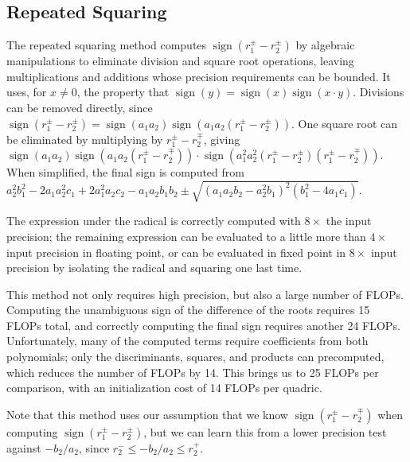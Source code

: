 \documentclass{cccg16}
\DeclareMathOperator{\sign}{sign}
\begin{document}
\subsection{Repeated Squaring}
The repeated squaring method computes $\sign(r_1^\pm-r_2^\pm)$ by algebraic
manipulations to eliminate division and square root
operations, leaving multiplications and additions whose precision requirements can be bounded. 
It uses, for $x\ne 0$,  the property that $\sign(y)=\sign(x)\sign(x\cdot y)$.   
Divisions can be removed directly, since 
 $\sign(r_1^\pm-r_2^\pm)=\sign(a_1 a_2)\sign(a_1 a_2 (r_1^\pm-r_2^\pm))$.  One 
square root can be eliminated by multiplying by $r_1^\pm-r_2^\mp$,
giving~$\sign(a_1 a_2)\sign(a_1 a_2
(r_1^\pm-r_2^\mp))\cdot\sign(a_1^2 a_2^2 (r_1^\pm - r_2^\pm) (r_1^\pm -
r_2^\mp))$.  When simplified, the final sign is computed
from~$a_2^2b_1^2-2a_1a_2^2c_1+2a_1^2a_2c_2-a_1a_2b_1b_2\pm
\sqrt{(a_1a_2b_2-a_2^2b_1)^2(b_1^2-4a_1c_1)}$.   

The expression under the radical is correctly computed with $8\times$
the input precision; the remaining expression can be evaluated to a
little more than $4\times$ input precision in floating point, or can
be evaluated in fixed point in $8\times$ input precision by isolating
the radical and squaring one last time.

This method not only requires high precision, but also a large number
of FLOPs.  Computing the unambiguous sign of the difference of the
roots requires 15 FLOPs total, and correctly computing the final sign
requires another 24 FLOPs.  Unfortunately, many of the computed terms
require coefficients from both polynomials; only the discriminants,
squares, and products can precomputed, which reduces the number of
FLOPs by 14.  This brings us to 25 FLOPs per comparison, with an
initialization cost of 14 FLOPs per quadric.

Note that this method uses our assumption that we know
$\sign(r_1^\pm-r_2^\mp)$ when computing $\sign(r_1^\pm-r_2^\pm)$, but
we can learn this from a lower precision test against $-b_2/a_2$,
since $r_2^- \le -b_2/a_2 \le r_2^+$.
\end{document}
